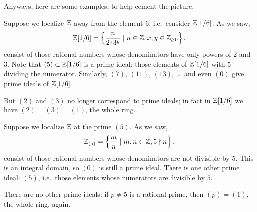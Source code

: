 Anyways, here are some examples, to help cement the picture.
\begin{example}
	Suppose we localize $\mathbb Z$ away from the element $6$,
	i.e.\ consider $\mathbb Z[1/6]$.
	As we saw,
	\[ \mathbb Z[1/6] = \left\{ \frac{n}{2^x 3^y} \mid n \in \mathbb Z,
		x,y \in \mathbb Z_{\ge 0} \right\}.  \]
	consist of those rational numbers whose
	denominators have only powers of $2$ and $3$.
	Note that $(5) \subset \mathbb Z[1/6]$ is a prime ideal:
	those elements of $\mathbb Z[1/6]$ with $5$ dividing the numerator.
	Similarly, $(7)$, $(11)$, $(13)$, \dots\
	and even $(0)$ give prime ideals of $\mathbb Z[1/6]$.

	But $(2)$ and $(3)$ no longer correspond to
	prime ideals; in fact in $\mathbb Z[1/6]$ we have $(2) = (3) = (1)$,
	the whole ring.
\end{example}

\begin{example}
	Suppose we localize $\mathbb Z$ at the prime $(5)$.
	As we saw,
	\[ \mathbb Z_{(5)} = \left\{ \frac{m}{n} \mid m,n \in \mathbb Z,
			5 \nmid n \right\}.  \]
	consist of those rational numbers whose
	denominators are not divisible by $5$.
	This is an integral domain, so $(0)$ is still a prime ideal.
	There is one other prime ideal: $(5)$,
	i.e.\ those elements whose numerators are divisible by $5$.

	There are no other prime ideals:
	if $p \neq 5$ is a rational prime,
	then $(p) = (1)$, the whole ring, again.
\end{example}

